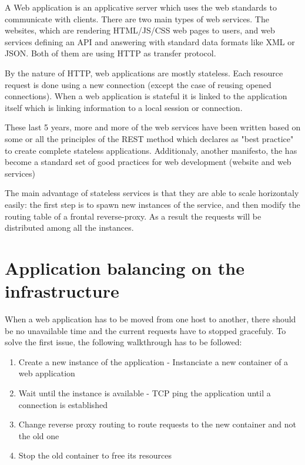 A Web application is an applicative server which uses the web standards to
communicate with clients. There are two main types of web services. The
websites, which are rendering HTML/JS/CSS web pages to users, and web services
defining an API and answering with standard data formats like XML or JSON. Both
of them are using HTTP as transfer protocol.

By the nature of HTTP, web applications are mostly stateless. Each resource
request is done using a new connection (except the case of reusing opened
connections). When a web application is stateful it is linked to the
application itself which is linking information to a local session or
connection.

These last 5 years, more and more of the web services have been written based
on some or all the principles of the REST method which declares as "best
practice" to create complete stateless applications. Additionaly, another
manifesto, the \cite{website12Factors} has become a standard set of good
practices for web development (website and web services)

The main advantage of stateless services is that they are able to scale
horizontaly easily: the first step is to spawn new instances of the service,
and then modify the routing table of a frontal reverse-proxy. As a result the
requests will be distributed among all the instances.

\section{Application balancing on the infrastructure}

When a web application has to be moved from one host to another, there should
be no unavailable time and the current requests have to stopped gracefuly. To
solve the first issue, the following walkthrough has to be followed:

\begin{enumerate}
	\item{Create a new instance of the application - Instanciate a new
	container of a web application}
	\item{Wait until the instance is available - TCP ping the application
	until a connection is established}
	\item{Change reverse proxy routing to route requests to the new
	container and not the old one}
	\item{Stop the old container to free its resources}
\end{enumerate}

